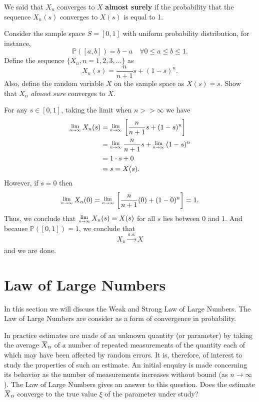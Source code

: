 \begin{definition}
We said that $X_n$ converges to $X$ \textbf{almost surely} if the probability that the sequence $X_n(s)$ 
converges to $X(s)$ is equal to 1.
\end{definition}

\begin{example}
    Consider the sample space $S = [0,1]$ with uniform probability distribution, for instance,
    \[
        \mathbb{P}([a,b]) = b - a \quad \forall 0 \leq a \leq b \leq 1.
    \]
    Define the sequence $\{X_n, n=1,2,3,\ldots\}$ as 
    \[
        X_n(s) = \frac{n}{n+1}s + (1-s)^n.
    \]
    Also, define the random variable $X$ on the sample space as $X(s) = s$. Show that $X_n$ 
    \textit{almost sure} converges to $X$.
\end{example}
\begin{solution}
    For any $s \in [0,1]$, taking the limit when $n >> \infty$ we have 
    \begin{align*}
        \Lim{n \to \infty}X_n(s) &= \Lim{n \to \infty} \left[ \frac{n}{n+1}s + (1 - s)^n \right]\\
        &= \Lim{n \to \infty} \frac{n}{n+1}s + \Lim{n \to \infty} (1 - s)^n\\
        &= 1\cdot s + 0\\
        &= s = X(s).
    \end{align*}
    However, if $s=0$ then 
    \[
        \Lim{n \to \infty}X_n(0) = \Lim{n \to \infty} \left[ \frac{n}{n+1}(0) + (1-0)^n\right] = 1.
    \]
    Thus, we conclude that $\Lim{n \to \infty} X_n(s) = X(s)$ for all $s$ lies between 0 and 1.
    And because $\mathbb{P}([0,1]) = 1$, we conclude that
    \[
        X_n \xrightarrow[]{a.s.} X
    \]
    and we are done.
\end{solution}

\section{Law of Large Numbers}

In this section we will discuss the Weak and Strong Law of Large Numbers. The Law of Large 
Numbers are consider as a form of convergence in probability.

In practice estimates are made of an unknown quantity (or parameter) by taking the average $\ols{X}_n$
of a number of repeated measurements of the quantity each of which may have been affected by random errors. It is, 
therefore, of interest to study the properties of such an estimate. An initial enquiry is made concerning its behavior 
as the number of measurements increases without bound (as $n \to \infty$). The Law of Large Numbers gives an answer to this question.
Does the estimate $\ols{X}_n$ converge to the true value $\xi$ of the parameter under study?

